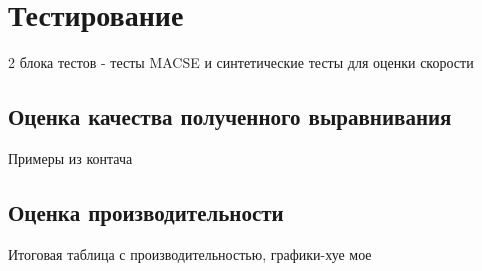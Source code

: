 \newpage

\section[Тестирование]{\large \centering Тестирование}
\hspace{\parindent} 2 блока тестов - тесты MACSE и синтетические тесты для оценки скорости

\subsection[Оценка качества полученного выравнивания]{\large Оценка качества полученного выравнивания}
\hspace{\parindent} Примеры из контача

\subsection[Оценка производительности]{\large Оценка производительности}
\hspace{\parindent} Итоговая таблица с производительностью, графики-хуе мое
